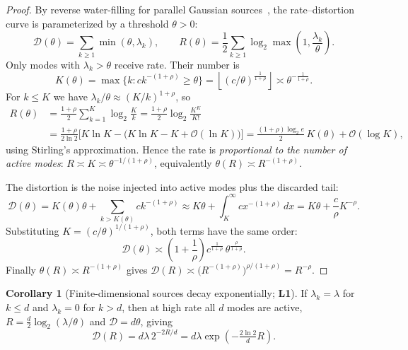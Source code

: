\documentclass[11pt,a4paper]{article}
\theoremstyle{definition}
\newtheorem{corollary}[theorem]{Corollary}
\begin{document}
\begin{proof}
By reverse water-filling for parallel Gaussian sources~\cite{berger1971rate,coverthomas2006elements}, the rate--distortion curve is parameterized by a threshold $\theta>0$:
\begin{equation}
  \mathcal{D}(\theta) = \sum_{k\ge 1}\min(\theta,\lambda_k), \qquad
  R(\theta) = \frac{1}{2}\sum_{k\ge 1}\log_2\max\!\left(1,\frac{\lambda_k}{\theta}\right).
\end{equation}
Only modes with $\lambda_k>\theta$ receive rate. Their number is
\begin{equation}
  K(\theta) = \max\{k : c k^{-(1+\rho)} \ge \theta\} = \left\lfloor (c/\theta)^{\frac{1}{1+\rho}}\right\rfloor \asymp \theta^{-\frac{1}{1+\rho}} .
\end{equation}
For $k\le K$ we have $\lambda_k/\theta \approx (K/k)^{1+\rho}$, so
\begin{align}
  R(\theta) &= \frac{1+\rho}{2}\sum_{k=1}^{K}\log_2\frac{K}{k}
             = \frac{1+\rho}{2}\log_2\frac{K^K}{K!} \nonumber\\
            &= \frac{1+\rho}{2\ln 2}\Big[K\ln K - \big(K\ln K - K + \mathcal{O}(\ln K)\big)\Big]
             = \frac{(1+\rho)\log_2 e}{2}\,K(\theta) + \mathcal{O}(\log K),
\end{align}
using Stirling's approximation. Hence the rate is \emph{proportional to the number of active modes}: $R \asymp K \asymp \theta^{-1/(1+\rho)}$, equivalently $\theta(R) \asymp R^{-(1+\rho)}$.

The distortion is the noise injected into active modes plus the discarded tail:
\begin{equation}
  \mathcal{D}(\theta) = K(\theta)\theta + \sum_{k>K(\theta)} c k^{-(1+\rho)}
   \approx K\theta + \int_{K}^{\infty} c x^{-(1+\rho)}\,dx = K\theta + \frac{c}{\rho}K^{-\rho} .
\end{equation}
Substituting $K=(c/\theta)^{1/(1+\rho)}$, both terms have the same order:
\begin{equation}
  \mathcal{D}(\theta) \asymp \left(1+\frac{1}{\rho}\right) c^{\frac{1}{1+\rho}}\,\theta^{\frac{\rho}{1+\rho}} .
\end{equation}
Finally $\theta(R)\asymp R^{-(1+\rho)}$ gives $\mathcal{D}(R) \asymp \big(R^{-(1+\rho)}\big)^{\rho/(1+\rho)} = R^{-\rho}$.
\end{proof}

\begin{corollary}[Finite-dimensional sources decay exponentially; \textbf{L1}]
If $\lambda_k = \lambda$ for $k\le d$ and $\lambda_k=0$ for $k>d$, then at high rate all $d$ modes are active, $R = \tfrac{d}{2}\log_2(\lambda/\theta)$ and $\mathcal{D}=d\theta$, giving
\begin{equation}
  \mathcal{D}(R) = d\lambda\, 2^{-2R/d} = d\lambda \exp\!\left(-\tfrac{2\ln 2}{d}R\right).
\end{equation}
\end{corollary}
\end{document}

